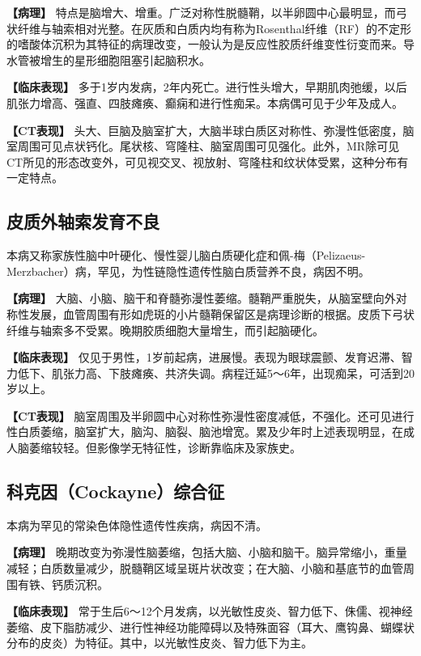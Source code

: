 \textbf{【病理】}
特点是脑增大、增重。广泛对称性脱髓鞘，以半卵圆中心最明显，而弓状纤维与轴索相对光整。在灰质和白质内均有称为Rosenthal纤维（RF）的不定形的嗜酸体沉积为其特征的病理改变，一般认为是反应性胶质纤维变性衍变而来。导水管被增生的星形细胞阻塞引起脑积水。

\textbf{【临床表现】}
多于1岁内发病，2年内死亡。进行性头增大，早期肌肉弛缓，以后肌张力增高、强直、四肢瘫痪、癫痫和进行性痴呆。本病偶可见于少年及成人。

\textbf{【CT表现】}
头大、巨脑及脑室扩大，大脑半球白质区对称性、弥漫性低密度，脑室周围可见点状钙化。尾状核、穹隆柱、脑室周围可见强化。此外，MR除可见CT所见的形态改变外，可见视交叉、视放射、穹隆柱和纹状体受累，这种分布有一定特点。

\subsection{皮质外轴索发育不良}

本病又称家族性脑中叶硬化、慢性婴儿脑白质硬化症和佩-梅（Pelizaeus-Merzbacher）病，罕见，为性链隐性遗传性脑白质营养不良，病因不明。

\textbf{【病理】}
大脑、小脑、脑干和脊髓弥漫性萎缩。髓鞘严重脱失，从脑室壁向外对称性发展，血管周围有形如虎斑的小片髓鞘保留区是病理诊断的根据。皮质下弓状纤维与轴索多不受累。晚期胶质细胞大量增生，而引起脑硬化。

\textbf{【临床表现】}
仅见于男性，1岁前起病，进展慢。表现为眼球震颤、发育迟滞、智力低下、肌张力高、下肢瘫痪、共济失调。病程迁延5～6年，出现痴呆，可活到20岁以上。

\textbf{【CT表现】}
脑室周围及半卵圆中心对称性弥漫性密度减低，不强化。还可见进行性白质萎缩，脑室扩大，脑沟、脑裂、脑池增宽。累及少年时上述表现明显，在成人脑萎缩较轻。但影像学无特征性，诊断靠临床及家族史。

\subsection{科克因（Cockayne）综合征}

本病为罕见的常染色体隐性遗传性疾病，病因不清。

\textbf{【病理】}
晚期改变为弥漫性脑萎缩，包括大脑、小脑和脑干。脑异常缩小，重量减轻；白质数量减少，脱髓鞘区域呈斑片状改变；在大脑、小脑和基底节的血管周围有铁、钙质沉积。

\textbf{【临床表现】}
常于生后6～12个月发病，以光敏性皮炎、智力低下、侏儒、视神经萎缩、皮下脂肪减少、进行性神经功能障碍以及特殊面容（耳大、鹰钩鼻、蝴蝶状分布的皮炎）为特征。其中，以光敏性皮炎、智力低下为主。

